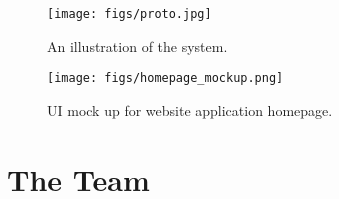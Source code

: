 \documentclass{article}
\begin{document}
  


\begin{figure}[h]
\vskip 5mm
\begin{center}
\centerline{\texttt{[image: figs/proto.jpg]}}
\caption{An illustration of the system.}
\label{fig:proto}
\end{center}
\vskip -5mm
\end{figure} 


\begin{figure}[h]
\vskip 5mm
\begin{center}
\centerline{\texttt{[image: figs/homepage\_mockup.png]}}
\caption{UI mock up for website application homepage.}
\label{fig:app}
\end{center}
\vskip -5mm
\end{figure}

\section{The Team}
\end{document}
